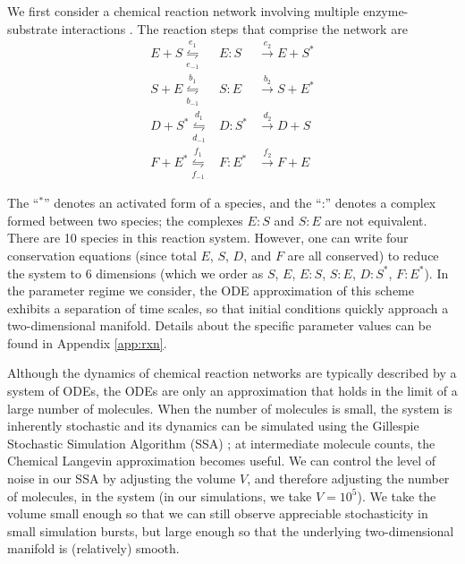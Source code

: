\documentclass[aip,jcp,preprint]{revtex4-1}
\begin{document}
We first consider a chemical reaction network involving  multiple enzyme-substrate interactions \cite{zagaris2012stability}.
%
The reaction steps that comprise the network are\\
\begin{equation}
\begin{array}{rcl}
E + S \overset{e_1}{\underset{e_{-1}}{\leftrightharpoons}} & E:S & \overset{e_2}{\rightarrow} E + S^{*} \\
S + E \overset{b_1}{\underset{b_{-1}}{\leftrightharpoons}} & S:E & \overset{b_2}{\rightarrow} S + E^{*}\\
D + S^{*} \overset{d_1}{\underset{d_{-1}}{\leftrightharpoons}} & D:S^{*} & \overset{d_2}{\rightarrow} D + S\\
F + E^{*} \overset{f_1}{\underset{f_{-1}}{\leftrightharpoons}} & F:E^{*} & \overset{f_2}{\rightarrow} F + E
\end{array}
\end{equation}

The ``$^{*}$'' denotes an activated form of a species, and the ``:'' denotes a complex formed between two species; the complexes $E:S$ and $S:E$ are not equivalent.
%
There are 10 species in this reaction system.
%
However, one can write four conservation equations (since total $E$, $S$, $D$, and $F$ are all conserved) to reduce the system to 6 dimensions
(which we order as $S$, $E$, $E:S$, $S:E$, $D:S^{*}$, $F:E^{*}$).
%
In the parameter regime we consider, the ODE approximation of this scheme exhibits a separation of time scales, so that initial conditions quickly approach a two-dimensional manifold.
%
Details about the specific parameter values can be found in Appendix \ref{app:rxn}.

Although the dynamics of chemical reaction networks are typically described by a system of ODEs, the ODEs are only an approximation that holds
in the limit of a large number of molecules.
%
When the number of molecules is small, the system is inherently stochastic and its dynamics can be simulated using the
Gillespie Stochastic Simulation Algorithm (SSA) \cite{gillespie1977exact}; at intermediate molecule counts, the Chemical Langevin approximation
becomes useful.
%
We can control the level of noise in our SSA by adjusting the volume $V$, and therefore adjusting the number of molecules, in the system (in our simulations, we take $V=10^5$).
%
We take the volume small enough so that we can still observe appreciable stochasticity in small simulation bursts, but large enough so that the underlying two-dimensional manifold is (relatively) smooth.
\end{document}
